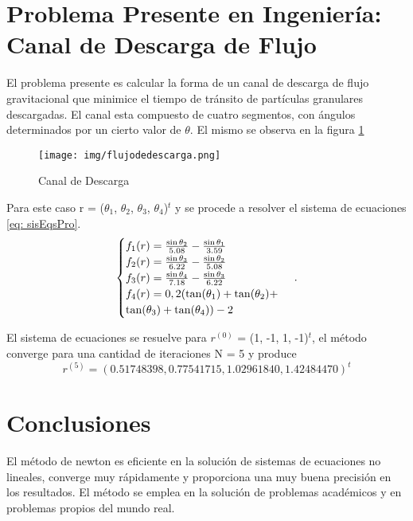 \documentclass[journal]{IEEEtran}
\begin{document}
\section{Problema Presente en Ingeniería: Canal de Descarga de Flujo}

El problema presente es calcular la forma de un canal de descarga de flujo gravitacional que minimice el tiempo de tránsito de partículas granulares descargadas. El canal esta compuesto de cuatro segmentos, con ángulos determinados por un cierto valor de $\theta$.  El mismo se observa en la figura \ref{fig:canalDesc}
\begin{figure}[H]
	\centering
	\texttt{[image: img/flujodedescarga.png]}
	\caption{Canal de Descarga}
	\label{fig:canalDesc}
\end{figure}


Para este caso r = ($\theta_1$, $\theta_2$, $\theta_3$, $\theta_4$)$^t$ y se procede a resolver el sistema de ecuaciones \ref{eq: sisEqsPro}. 
\begin{equation}
    \begin{cases}
        f_{1}(r)= \frac{\sin{\theta_2}}{5.08}-\frac{\sin{\theta_1}}{3.59}  \\
        f_{2}(r)= \frac{\sin{\theta_3}}{6.22}-\frac{\sin{\theta_2}}{5.08} \\
        f_{3}(r)= \frac{\sin{\theta_4}}{7.18}-\frac{\sin{\theta_3}}{6.22}  \\
        f_{4}(r)= 0,2 (\tan (\theta_1) + \tan (\theta_2) + \\ \tan (\theta_3) + \tan (\theta_4)) - 2
    \end{cases}\,.
    \label{eq: sisEqsPro}\\
\end{equation}

El sistema de ecuaciones se resuelve para $r^{(0)}$ = (1, -1, 1, -1)$^t$, el método converge para una cantidad de iteraciones N = 5 y produce
\begin{equation*}
    r^{(5)} = (0.51748398, 0.77541715, 1.02961840, 1.42484470)^t
\end{equation*}

\section{Conclusiones}
El método de newton es eficiente en la solución de
sistemas de ecuaciones no lineales, converge muy
rápidamente y proporciona una muy buena precisión en
los resultados. El método se emplea en la solución de
problemas académicos y en problemas propios del
mundo real. \cite{proble}
\end{document}
